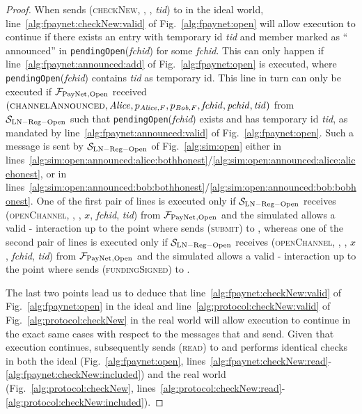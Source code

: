\begin{proof}
  When \environment{} sends (\textsc{checkNew}, \alice, \bob, \textit{tid}) to
  \alice{} in the ideal world, line~\ref{alg:fpaynet:checkNew:valid} of
  Fig.~\ref{alg:fpaynet:open} will allow execution to continue if there exists
  an entry with temporary id \textit{tid} and member \alice{} marked as
  ``\alice{} announced'' in \texttt{pendingOpen}(\textit{fchid}) for some
  \textit{fchid}. This can only happen if line~\ref{alg:fpaynet:announced:add}
  of Fig.~\ref{alg:fpaynet:open} is executed, where
  \texttt{pendingOpen}(\textit{fchid}) contains \textit{tid} as temporary id.
  This line in turn can only be executed if $\mathcal{F}_{\mathrm{PayNet}}{}_{\mathrm{, Open}}$
  received $\left(\textsc{channelAnnounced}, \mathit{Alice}, p_{\mathit{Alice}, F}, p_{\mathit{Bob},
  F}, \mathit{fchid}, \mathit{pchid}, \mathit{tid}\right)$ from
  $\mathcal{S}_{\mathrm{LN - Reg - Open}}$ such that
  \texttt{pendingOpen}(\textit{fchid}) exists and has temporary id
  \textit{tid}, as mandated by line~\ref{alg:fpaynet:announced:valid} of
  Fig.~\ref{alg:fpaynet:open}. Such a message is sent by
  $\mathcal{S}_{\mathrm{LN - Reg - Open}}$ of Fig.~\ref{alg:sim:open} either in
  lines~\ref{alg:sim:open:announced:alice:bothhonest}/\ref{alg:sim:open:announced:alice:alicehonest},
  or in
  lines~\ref{alg:sim:open:announced:bob:bothhonest}/\ref{alg:sim:open:announced:bob:bobhonest}.
  One of the first pair of lines is executed only if $\mathcal{S}_{\mathrm{LN -
  Reg - Open}}$ receives (\textsc{openChannel}, \alice, \bob, $x$,
  \textit{fchid}, \textit{tid}) from $\mathcal{F}_{\mathrm{PayNet}}{}_{\mathrm{, Open}}$ and the
  simulated \adversary{} allows a valid \alice-\bob{} interaction up to the
  point where \alice{} sends (\textsc{submit}) to \ledger, whereas one of the
  second pair of lines is executed only if $\mathcal{S}_{\mathrm{LN - Reg -
  Open}}$ receives (\textsc{openChannel}, \bob, \alice, $x$, \textit{fchid},
  \textit{tid}) from $\mathcal{F}_{\mathrm{PayNet}}{}_{\mathrm{, Open}}$ and the simulated
  \adversary{} allows a valid \alice-\bob{} interaction up to the point where
  \alice{} sends (\textsc{fundingSigned}) to \bob.

  The last two points lead us to deduce that
  line~\ref{alg:fpaynet:checkNew:valid} of Fig.~\ref{alg:fpaynet:open} in the
  ideal and line~\ref{alg:protocol:checkNew:valid} of
  Fig.~\ref{alg:protocol:checkNew} in the real world will allow execution to
  continue in the exact same cases with respect to the messages that
  \environment{} and \adversary{} send. Given that execution continues,
  \alice{} subsequently sends (\textsc{read}) to \ledger{} and performs
  identical checks in both the ideal (Fig.~\ref{alg:fpaynet:open},
  lines~\ref{alg:fpaynet:checkNew:read}-\ref{alg:fpaynet:checkNew:included})
  and the real world (Fig.~\ref{alg:protocol:checkNew},
  lines~\ref{alg:protocol:checkNew:read}-\ref{alg:protocol:checkNew:included}).


\end{proof}
